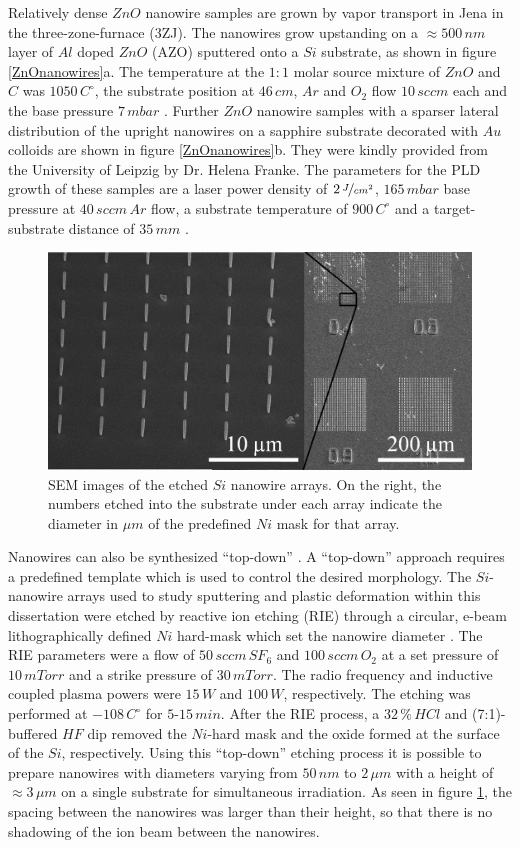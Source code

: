 Relatively dense $ZnO$ nanowire samples are grown by vapor transport in Jena in the three-zone-furnace (3ZJ). The nanowires grow upstanding on a $\approx 500\,nm$ layer of $Al$ doped $ZnO$ (AZO) sputtered onto a $Si$ substrate, as shown in figure \ref{ZnOnanowires}a. The temperature at the $1:1$ molar source mixture of $ZnO$ and $C$ was $1050\,C^\circ$, the substrate position at $46\, cm$, $Ar$ and $O_2$ flow $10\, sccm$ each and the base pressure $7\, mbar$ \cite{borchers_catalyst_2006, stichtenoth_dimensionseffekte_2008, muller_structural_2009,ogrisek_kontrolliertes_2013}. Further $ZnO$ nanowire samples with a sparser lateral distribution of the upright nanowires on a sapphire substrate decorated with $Au$ colloids are shown in figure \ref{ZnOnanowires}b. They were kindly provided from the University of Leipzig by Dr. Helena Franke. The parameters for the PLD growth of these samples are a laser power density of $2\, \nicefrac{J}{cm^2}$, $165\, mbar$ base pressure at $40\, sccm\, Ar$ flow, a substrate temperature of $900\, C^\circ$ and a target-substrate distance of $35\,mm$ \cite{cao_tuning_2010}.


\begin{figure}
	\centering
		\includegraphics[width=.5\textwidth]{images/SEMarray.jpg}
	\caption{SEM images of the etched $Si$ nanowire arrays. On the right, the numbers etched into the substrate under each array indicate the diameter in $\mu m$ of the predefined $Ni$ mask for that array.}
	\label{SEMarray}
\end{figure} 


Nanowires can also be synthesized ``top-down'' \cite{haginoya_nanostructure_1997,hausmann_fabrication_2010}. A ``top-down'' approach requires a predefined template which is used to control the desired morphology. The $Si$-nanowire arrays used to study sputtering and plastic deformation within this dissertation were etched by reactive ion etching (RIE) through a circular, e-beam lithographically defined $Ni$ hard-mask which set the nanowire diameter \cite{johannes_anomalous_2015}. The RIE parameters were a flow of $50\,sccm\,SF_6$ and $100\,sccm\,O_2$ at a set pressure of $10\,mTorr$ and a strike pressure of $30\,mTorr$. The radio frequency and inductive coupled plasma powers were $15\,W$ and $100\,W$, respectively. The etching was performed at $-108\,C^\circ$ for $5$-$15\,min$. After the RIE process, a $32\,\%\,HCl$ and (7:1)-buffered $HF$ dip removed the $Ni$-hard mask and the oxide formed at the surface of the $Si$, respectively. Using this ``top-down'' etching process it is possible to prepare nanowires with diameters varying from $50\,nm$ to $2\,\mu m$ with a height of $\approx 3\,\mu m$ on a single substrate for simultaneous irradiation. As seen in figure \ref{SEMarray}, the spacing between the nanowires was larger than their height, so that there is no shadowing of the ion beam between the nanowires.


